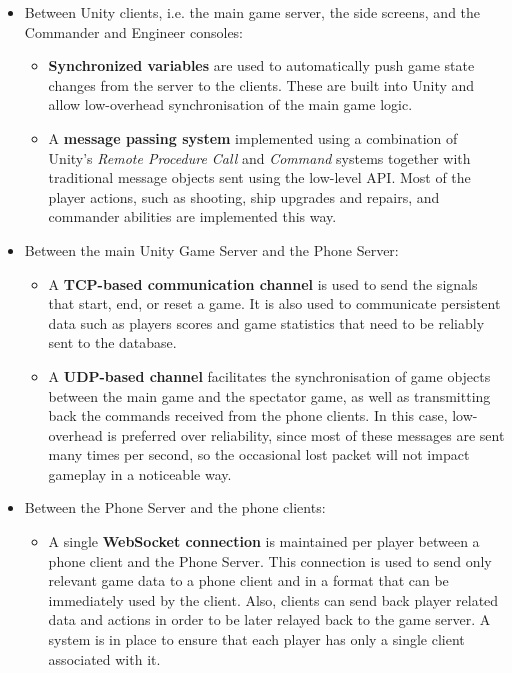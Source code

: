 \documentclass[a4paper,11pt]{article}
\begin{document}
\begin{itemize}
	\item Between Unity clients, i.e. the main game server, the side screens, and the Commander and Engineer consoles:
    
	\begin{itemize}[topsep=0ex]
      \item \textbf{Synchronized variables} are used to automatically push game state changes from the server to the clients. These are built into Unity and allow low-overhead synchronisation of the main game logic.
      \item A \textbf{message passing system} implemented using a combination of Unity’s  \emph{Remote Procedure Call} and \emph{Command} systems together with traditional message objects sent using the low-level API. Most of the player actions, such as shooting, ship upgrades and repairs, and commander abilities are implemented this way.
  	\end{itemize}
    
	\item Between the main Unity Game Server and the Phone Server:
    
  \begin{itemize}[topsep=0ex]
 	 \item A \textbf{TCP-based communication channel} is used to send the signals that start, end, or reset a game. It is also used to communicate persistent data such as players scores and game statistics that need to be reliably sent to the database.
 	 \item A \textbf{UDP-based channel} facilitates the synchronisation of game objects between the main game and the spectator game, as well as transmitting back the commands received from the phone clients. In this case, low-overhead is preferred over reliability, since most of these messages are sent many times per second, so the occasional lost packet will not impact gameplay in a noticeable way.
  \end{itemize}
  
\item Between the Phone Server and the phone clients:

  \begin{itemize}[topsep=0ex]
  	\item A single \textbf{WebSocket connection} is maintained per player between a phone client and the Phone Server. This connection is used to send only relevant game data to a phone client and in a format that can be immediately used by the client. Also, clients can send back player related data and actions in order to be later relayed back to the game server. A system is in place to ensure that each player has only a single client associated with it.
  \end{itemize}
  
\end{itemize}
\end{document}
